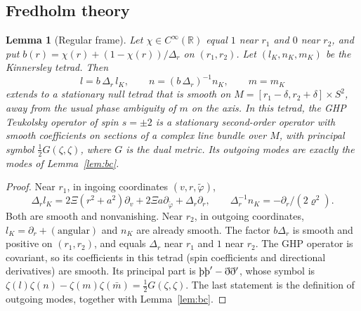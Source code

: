 \documentclass[11pt]{amsart}
\newtheorem{lemma}[theorem]{Lemma}
\theoremstyle{definition}
\theoremstyle{remark}
\numberwithin{equation}{section}
\newcommand{\Th}{\text{\th}}
\newcommand{\R}{\mathbb{R}}
\begin{document}
\subsection{Fredholm theory}
\begin{lemma}[Regular frame]\label{lem:regframe}
Let $\chi\in C^\infty(\R)$ equal $1$ near $r_1$ and $0$ near $r_2$, and put $b(r)=\chi(r)+(1-\chi(r))/\Delta_r$ on
$(r_1,r_2)$. Let $(l_K,n_K,m_K)$ be the Kinnersley tetrad. Then
\[
l=b\,\Delta_r\,l_K,\qquad n=(b\,\Delta_r)^{-1}n_K,\qquad m=m_K
\]
extends to a stationary null tetrad that is smooth on $M=[r_1-\delta,r_2+\delta]\times S^2$, away from the usual phase
ambiguity of $m$ on the axis. In this tetrad, the GHP Teukolsky operator of spin $s=\pm2$ is a stationary second-order
operator with smooth coefficients on sections of a complex line bundle over $M$, with principal symbol
$\frac12G(\zeta,\zeta)$, where $G$ is the dual metric. Its outgoing modes are exactly the modes of
Lemma~\ref{lem:bc}.
\end{lemma}

\begin{proof}
Near $r_1$, in ingoing coordinates $(v,r,\tilde\varphi)$,
\[
\Delta_rl_K=2\Xi(r^2+a^2)\partial_v+2\Xi a\partial_{\tilde\varphi}+\Delta_r\partial_r,\qquad \Delta_r^{-1}n_K=-\partial_r/(2\varrho^2).
\]
Both are smooth and nonvanishing. Near $r_2$, in outgoing coordinates, $l_K=\partial_r+(\text{angular})$ and $n_K$ are
already smooth. The factor $b\Delta_r$ is smooth and positive on $(r_1,r_2)$, and equals $\Delta_r$ near $r_1$ and $1$
near $r_2$. The GHP operator is covariant, so its coefficients in this tetrad (spin coefficients and directional
derivatives) are smooth. Its principal part is $\Th\Th'-\eth\eth'$, whose symbol is
$\zeta(l)\zeta(n)-\zeta(m)\zeta(\bar m)=\frac12G(\zeta,\zeta)$. The last statement is the definition of outgoing
modes, together with Lemma~\ref{lem:bc}.
\end{proof}
\end{document}
